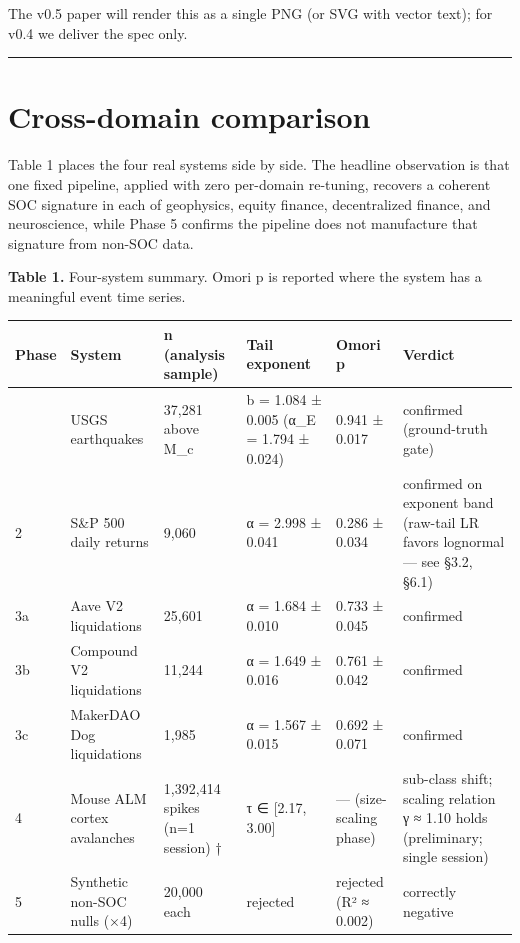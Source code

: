 \documentclass[
  11pt]{article}
\newcounter{none} %
\begin{document}

The v0.5 paper will render this as a single PNG (or SVG with vector
text); for v0.4 we deliver the spec only.

\begin{center}\rule{0.5\linewidth}{0.5pt}\end{center}

\section{Cross-domain comparison}\label{sec:4}

Table 1 places the four real systems side by side. The headline
observation is that one fixed pipeline, applied with zero per-domain
re-tuning, recovers a coherent SOC signature in each of geophysics,
equity finance, decentralized finance, and neuroscience, while Phase 5
confirms the pipeline does not manufacture that signature from non-SOC
data.

\textbf{Table 1.} Four-system summary. Omori p is reported where the
system has a meaningful event time series.

{\def\LTcaptype{none} %
\begin{longtable}[]{@{}llllll@{}}
\toprule\noalign{}
Phase & System & n (analysis sample) & Tail exponent & Omori p &
Verdict \\
\midrule\noalign{}
\endhead
\bottomrule\noalign{}
\endlastfoot
1 & USGS earthquakes & 37,281 above M\_c & b = 1.084 ± 0.005 (α\_E =
1.794 ± 0.024) & 0.941 ± 0.017 & confirmed (ground-truth gate) \\
2 & S\&P 500 daily returns & 9,060 & α = 2.998 ± 0.041 & 0.286 ± 0.034 &
confirmed on exponent band (raw-tail LR favors lognormal --- see §3.2,
§6.1) \\
3a & Aave V2 liquidations & 25,601 & α = 1.684 ± 0.010 & 0.733 ± 0.045 &
confirmed \\
3b & Compound V2 liquidations & 11,244 & α = 1.649 ± 0.016 & 0.761 ±
0.042 & confirmed \\
3c & MakerDAO Dog liquidations & 1,985 & α = 1.567 ± 0.015 & 0.692 ±
0.071 & confirmed \\
4 & Mouse ALM cortex avalanches & 1,392,414 spikes (n=1 session) † & τ ∈
{[}2.17, 3.00{]} & --- (size-scaling phase) & sub-class shift; scaling
relation γ ≈ 1.10 holds (preliminary; single session) \\
5 & Synthetic non-SOC nulls (×4) & 20,000 each & rejected & rejected (R²
≈ 0.002) & correctly negative \\
\end{longtable}
}
\end{document}

